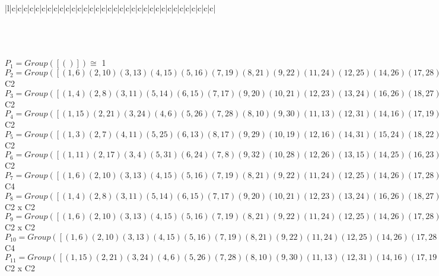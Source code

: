 \documentclass[varwidth=\maxdimen,border=10]{standalone}
\begin{document}
\begin{tabular}
\begin{array}{|l|c|c|c|c|c|c|c|c|c|c|c|c|c|c|c|c|c|c|c|c|c|c|c|c|c|c|c|c|c|c|c|c|c|c|}
\end{array}\)\\
\ \\
\ \\
$P_{1} = Group( [ () ] )\cong$ 1\ \\
$P_{2} = Group( [ ( 1, 6)( 2,10)( 3,13)( 4,15)( 5,16)( 7,19)( 8,21)( 9,22)(11,24)(12,25)(14,26)(17,28)(18,29)(20,30)(23,31)(27,32) ] )\cong$ C2\ \\
$P_{3} = Group( [ ( 1, 4)( 2, 8)( 3,11)( 5,14)( 6,15)( 7,17)( 9,20)(10,21)(12,23)(13,24)(16,26)(18,27)(19,28)(22,30)(25,31)(29,32) ] )\cong$ C2\ \\
$P_{4} = Group( [ ( 1,15)( 2,21)( 3,24)( 4, 6)( 5,26)( 7,28)( 8,10)( 9,30)(11,13)(12,31)(14,16)(17,19)(18,32)(20,22)(23,25)(27,29) ] )\cong$ C2\ \\
$P_{5} = Group( [ ( 1, 3)( 2, 7)( 4,11)( 5,25)( 6,13)( 8,17)( 9,29)(10,19)(12,16)(14,31)(15,24)(18,22)(20,32)(21,28)(23,26)(27,30) ] )\cong$ C2\ \\
$P_{6} = Group( [ ( 1,11)( 2,17)( 3, 4)( 5,31)( 6,24)( 7, 8)( 9,32)(10,28)(12,26)(13,15)(14,25)(16,23)(18,30)(19,21)(20,29)(22,27) ] )\cong$ C2\ \\
$P_{7} = Group( [ ( 1, 6)( 2,10)( 3,13)( 4,15)( 5,16)( 7,19)( 8,21)( 9,22)(11,24)(12,25)(14,26)(17,28)(18,29)(20,30)(23,31)(27,32), ( 1, 5, 6,16)( 2, 9,10,22)( 3,12,13,25)( 4,14,15,26)( 7,18,19,29)( 8,20,21,30)(11,23,24,31)(17,27,28,32) ] )\cong$ C4\ \\
$P_{8} = Group( [ ( 1, 4)( 2, 8)( 3,11)( 5,14)( 6,15)( 7,17)( 9,20)(10,21)(12,23)(13,24)(16,26)(18,27)(19,28)(22,30)(25,31)(29,32), ( 1, 3)( 2, 7)( 4,11)( 5,25)( 6,13)( 8,17)( 9,29)(10,19)(12,16)(14,31)(15,24)(18,22)(20,32)(21,28)(23,26)(27,30) ] )\cong$ C2 x C2\ \\
$P_{9} = Group( [ ( 1, 6)( 2,10)( 3,13)( 4,15)( 5,16)( 7,19)( 8,21)( 9,22)(11,24)(12,25)(14,26)(17,28)(18,29)(20,30)(23,31)(27,32), ( 1, 4)( 2, 8)( 3,11)( 5,14)( 6,15)( 7,17)( 9,20)(10,21)(12,23)(13,24)(16,26)(18,27)(19,28)(22,30)(25,31)(29,32) ] )\cong$ C2 x C2\ \\
$P_{10} = Group( [ ( 1, 6)( 2,10)( 3,13)( 4,15)( 5,16)( 7,19)( 8,21)( 9,22)(11,24)(12,25)(14,26)(17,28)(18,29)(20,30)(23,31)(27,32), ( 1,14, 6,26)( 2,20,10,30)( 3,23,13,31)( 4, 5,15,16)( 7,27,19,32)( 8, 9,21,22)(11,12,24,25)(17,18,28,29) ] )\cong$ C4\ \\
$P_{11} = Group( [ ( 1,15)( 2,21)( 3,24)( 4, 6)( 5,26)( 7,28)( 8,10)( 9,30)(11,13)(12,31)(14,16)(17,19)(18,32)(20,22)(23,25)(27,29), ( 1, 3)( 2, 7)( 4,11)( 5,25)( 6,13)( 8,17)( 9,29)(10,19)(12,16)(14,31)(15,24)(18,22)(20,32)(21,28)(23,26)(27,30) ] )\cong$ C2 x C2\ \\

\end{tabular}
\end{document}

